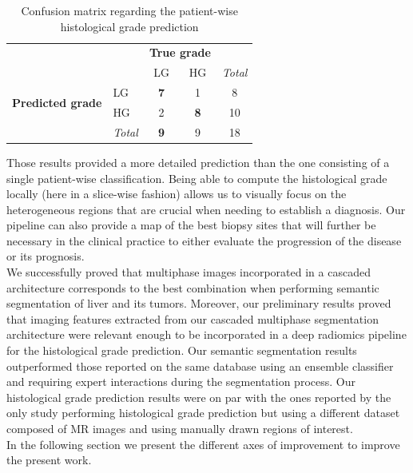\renewcommand{\arraystretch}{2}
\begin{table}[!htp]\centering
\caption{Confusion matrix regarding the patient-wise histological grade prediction}\label{tab:confusion_matrix}
\begin{tabular}{l|l|c|c|c}
\multicolumn{2}{c}{}&\multicolumn{2}{c}{\textbf{True grade}}&\\
\cline{3-4}
\multicolumn{2}{c|}{}&LG&HG&\multicolumn{1}{c}{\textit{Total}}\\
\cline{2-4}
\multirow{2}{*}{\textbf{Predicted grade}}& LG & \textbf{7} & 1 & 8\\
\cline{2-4}
& HG & 2 & \textbf{8} & 10 \\
\cline{2-4}
\multicolumn{1}{c}{} & \multicolumn{1}{c}{\textit{Total}} & \multicolumn{1}{c}{\textbf{9}} & \multicolumn{1}{c}{9} & \multicolumn{1}{c}{18}\\
\end{tabular}
\end{table}
\renewcommand{\arraystretch}{5}
Those results provided a more detailed prediction than the one
consisting of a single patient-wise classification. Being able to
compute the histological grade locally (here in a slice-wise fashion)
allows us to visually focus on the heterogeneous regions that are
crucial when needing to establish a diagnosis. Our pipeline can also
provide a map of the best biopsy sites that will further be necessary in
the clinical practice to either evaluate the progression of the disease
or its prognosis.\\
We successfully proved that multiphase images incorporated in a cascaded architecture corresponds to the best combination when performing semantic segmentation of liver and its tumors. Moreover, our preliminary results proved that imaging features extracted from our cascaded multiphase segmentation architecture were relevant enough to be incorporated in a deep radiomics pipeline for the histological grade prediction. 
Our semantic segmentation results outperformed those reported on the same database using an ensemble classifier and requiring expert interactions during the segmentation process.
Our histological grade prediction results were on par with the ones reported by the only study performing histological grade prediction but using a different dataset composed of MR images and using manually drawn regions of interest.\\
In the following section we present the different axes of improvement to improve the present work.

